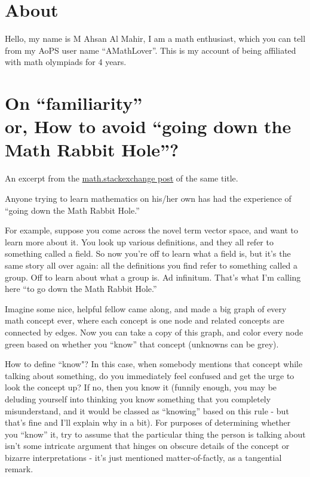 \pagestyle{empty}\section*{About}

Hello, my name is M Ahsan Al Mahir, I am a math enthusiast, which you can tell
from my AoPS user name ``A\textunderscore Math\textunderscore Lover''. This is
my account of being affiliated with math olympiads for 4 years.



\newpage \section*{\centering On ``familiarity'' \\ or, How to avoid ``going down the Math
Rabbit Hole''?}

An excerpt from the \href{https://math.stackexchange.com/questions/617625/on-familiarity-or-how-to-avoid-going-down-the-math-rabbit-hole}{math.stackexchange post} of the same title.

Anyone trying to learn mathematics on his/her own has had the experience of
``going down the Math Rabbit Hole.''

For example, suppose you come across the novel term vector space, and want to
learn more about it. You look up various definitions, and they all refer to
something called a field. So now you're off to learn what a field is, but it's
the same story all over again: all the definitions you find refer to something
called a group. Off to learn about what a group is. Ad infinitum. That's what
I'm calling here ``to go down the Math Rabbit Hole.''

Imagine some nice, helpful fellow came along, and made a big graph of every
math concept ever, where each concept is one node and related concepts are
connected by edges. Now you can take a copy of this graph, and color every
node green based on whether you ``know'' that concept (unknowns can be grey).

How to define ``know"? In this case, when somebody mentions that concept while
talking about something, do you immediately feel confused and get the urge to
look the concept up? If no, then you know it (funnily enough, you may be
deluding yourself into thinking you know something that you completely
misunderstand, and it would be classed as ``knowing'' based on this rule - but
that's fine and I'll explain why in a bit). For purposes of determining
whether you ``know'' it, try to assume that the particular thing the person is
talking about isn't some intricate argument that hinges on obscure details of
the concept or bizarre interpretations - it's just mentioned matter-of-factly,
as a tangential remark.

